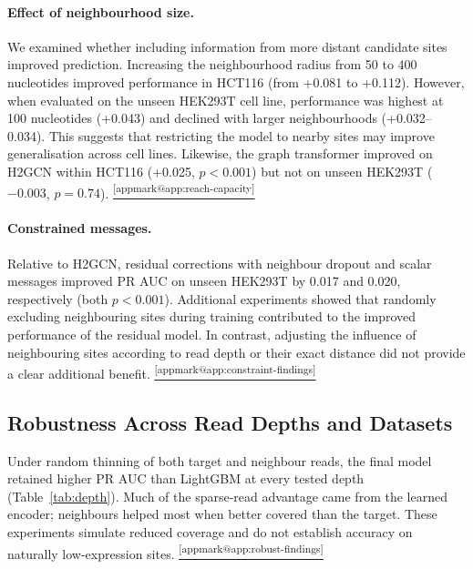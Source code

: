 \documentclass[11pt,a4paper]{article}
\makeatletter
\DeclareRobustCommand{\applink}[1]{%
    \hyperref[#1]{\textsuperscript{\ref*{appmark@#1}}}}
\makeatother
\begin{document}
\paragraph{Effect of neighbourhood size.}\label{sec:reach}\label{sec:capacity}
We examined whether including information from more distant candidate sites improved prediction. Increasing the neighbourhood radius from 50 to 400 nucleotides improved performance in HCT116 (from +0.081 to +0.112). However, when evaluated on the unseen HEK293T cell line, performance was highest at 100 nucleotides (+0.043) and declined with larger neighbourhoods (+0.032–0.034). This suggests that restricting the model to nearby sites may improve generalisation across cell lines.
Likewise, the graph transformer improved on H2GCN within HCT116
(+0.025, $p<0.001$) but not on unseen HEK293T ($-0.003$, $p=0.74$).
\applink{app:reach-capacity}

\paragraph{Constrained messages.}\label{sec:constrain}
Relative to H2GCN, residual corrections with neighbour
dropout and scalar messages improved PR AUC on unseen
HEK293T by 0.017 and 0.020, respectively
(both $p<0.001$). Additional experiments showed that randomly excluding neighbouring sites during training contributed to the improved performance of the residual model. In contrast, adjusting the influence of neighbouring sites according to read depth or their exact distance did not provide a clear additional benefit.
\applink{app:constraint-findings}

\subsection{Robustness Across Read Depths and Datasets}
\label{sec:robust}
Under random thinning of both target and neighbour reads, the final model
retained higher PR AUC than LightGBM at every tested depth
(Table~\ref{tab:depth}). Much of the sparse-read advantage came from the
learned encoder; neighbours helped most when better covered than the target.
These experiments simulate reduced coverage and do not establish accuracy
on naturally low-expression sites.\applink{app:robust-findings}
\end{document}
